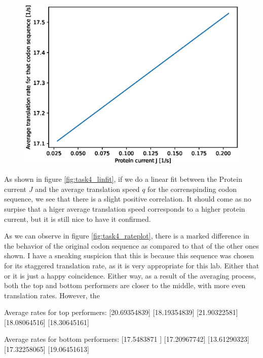 \documentclass{article}
\begin{document}
\begin{figure}[H]
	\centering
	\includegraphics[width=\linewidth]{figs/task4_linfit_labversion_v0.eps}
	\label{fig:task4_linfit}
\end{figure}
As shown in figure \eqref{fig:task4_linfit}, if we do a linear fit between the Protein current $J$ and the average translation speed $q$ for the correnspinding codon sequence, we see that there is a slight positive correlation. It should come as no surpise that a higer average translation speed corresponds to a higher protein current, but it is still nice to have it confirmed. 


As we can observe in figure  \eqref{fig:task4_rateplot}, there is a marked difference in the behavior of the original codon sequence as compared to that of the other ones shown. I have a sneaking suspicion that this is because this sequence was chosen for its staggered translation rate, as it is very appropriate for this lab. Either that or it is just a happy coincidence. 
Either way, as a result of the averaging process, both the top and bottom performers are closer to the middle, with more even translation rates. However, the 


Average rates for top performers: 
 [20.69354839]
 [18.19354839]
 [21.90322581]
 [18.08064516]
 [18.30645161]

Average rates for bottom performers: 
[17.5483871 ]
 [17.20967742]
 [13.61290323]
 [17.32258065]
 [19.06451613]
\end{document}
